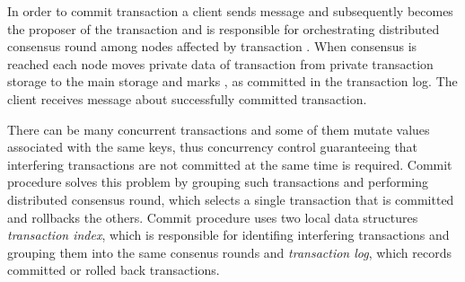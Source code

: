 In order to commit transaction \transaction a client \client sends message \txCommitMessage and subsequently  becomes the proposer of the transaction and is responsible for orchestrating distributed consensus round among nodes affected by transaction \transaction.
When consensus is reached each node moves private data of transaction \transaction from private transaction storage to the main storage and marks \transaction, as committed in the transaction log. The client \client receives message \txCommitResonseMessage about successfully committed transaction.

There can be many concurrent transactions and some of them mutate values associated with the same keys, thus concurrency control guaranteeing that interfering transactions are not committed at the same time is required. Commit procedure solves this problem by grouping such transactions and performing distributed consensus round, which selects a single transaction that is committed and rollbacks the others.
Commit procedure uses two local data structures \emph{transaction index}, which is responsible for identifing interfering transactions and grouping them into the same consenus rounds and \emph{transaction log}, which records committed or rolled back transactions.

